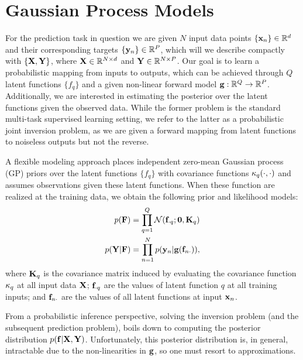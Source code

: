 \section{Gaussian Process Models}
For the prediction task in question we are given $N$ input data points $ \{ \mathbf{x}_n  \} \in \mathbb{R}^{d}$ and their corresponding  
targets $\{ \mathbf{y}_n  \} \in \mathbb{R}^{P}$, which will  we describe compactly with $\left\{{\mathbf{X}, \mathbf{Y}}\right\}$,
where $\mathbf{X} \in \mathbb{R}^{N \times d}$  and $\mathbf{Y} \in \mathbb{R}^{N \times P}$. Our goal is 
to learn a probabilistic mapping from inputs to outputs, which can be achieved through $Q$ latent  functions $\{ f_q \}$ and a given non-linear forward model $\mathbf{g} : \mathbb{R}^{Q} \to \mathbb{R}^{P}$. Additionally, we are interested in estimating the posterior over the latent functions given the observed data. 
While the former problem  is the standard multi-task supervised learning setting, we refer 
to the latter  as a probabilistic joint inversion problem, as we are given a forward mapping from 
latent functions to noiseless outputs but not the reverse. 

A  flexible modeling approach places independent zero-mean Gaussian process (GP) priors over 
the latent functions $\{ f_q \}$ with covariance functions $\kappa_q(\cdot, \cdot)$ and assumes
 \iid observations given these latent functions. When these function are realized at the training data,
we obtain the following prior and likelihood models:
\begin{align}
	\label{eq:gp-model-1}
	p(\mathbf{F})  &=  \prod_{q=1}^{Q} \mathcal{N}(\mathbf{f}_{\cdot q}; \mathbf{0}, \mathbf{K}_q) \\
	\label{eq:gp-model-2}	
	p(\mathbf{Y} | \mathbf{F}) &= \prod_{n=1}^N p(\mathbf{y}_n | \mathbf{g} ( \mathbf{f}_{n \cdot} )) \text{,}
\end{align}
where $\mathbf{K}_q$ is the covariance matrix induced by evaluating  the covariance 
function $\kappa_q$ at all input data $\mathbf{X}$; $\mathbf{f}_{\cdot q}$ are  the values 
of latent function $q$ at all training inputs; 
and $\mathbf{f}_{n \cdot}$ are  the values of all latent functions at input $\mathbf{x}_n$. 

From a probabilistic inference perspective, solving the inversion problem (and the 
subsequent prediction problem), boils down to computing the posterior distribution 
$p(\mathbf{f} | \mathbf{X}, \mathbf{Y})$. Unfortunately, this posterior distribution is, in general, 
intractable due to the non-linearities in $\mathbf{g}$, so one must resort to approximations.
%
